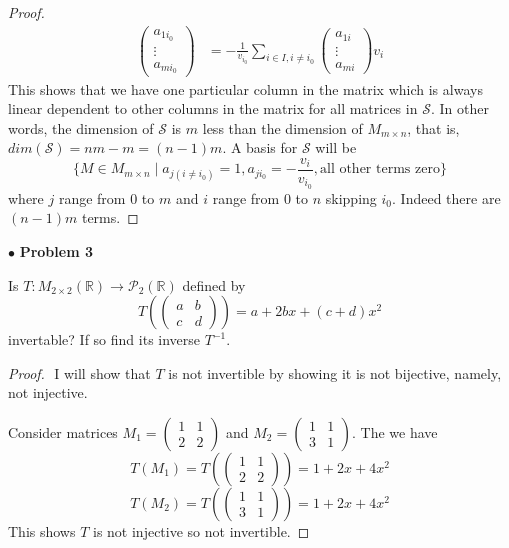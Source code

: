 \documentclass{article}
\begin{document}
\begin{proof}
\begin{align*}
  \begin{pmatrix} a_{1{i_0}} \\ \vdots \\ a_{m{i_0}} \end{pmatrix}  &= -\frac{1}{v_{i_0}}\sum_{i \in I, i \ne i_0} \begin{pmatrix} a_{1i} \\ \vdots \\ a_{mi} \end{pmatrix} v_i 
 \end{align*}
This shows that we have one particular column in the matrix which is always linear dependent to other columns in the matrix for all matrices in $\mathcal{S}$. In other words, the dimension of $\mathcal{S}$ is $m$ less than the dimension of $M_{m\times n}$, that is, $dim(\mathcal{S}) = nm - m = (n-1)m$. A basis for $\mathcal{S}$ will be $$ \{ M \in M_{m \times n}    \; | \; a_{j(i \ne i_0)} =1, a_{j{i_0}} = -\frac{v_i}{v_{i_0}} , \text{all other terms zero} \} $$
where $j$ range from $0$ to $m$ and $i$ range from $0$ to $n$ skipping $i_0$. Indeed there are $(n-1)m$ terms.
\end{proof}

\newpage
$ \bullet$ \textbf{Problem 3}
\medskip

\begin{itshape}
Is $T: M_{2 \times 2}(\mathbb{R}) \to \mathcal{P}_2(\mathbb{R})$ defined by $$T( \begin{pmatrix} a & b \\ c & d \end{pmatrix} ) = a+2bx + (c+d)x^2$$ invertable? If so find its inverse $T^{-1}$.
\end{itshape}
\medskip

\begin{proof}
$ $\newline
I will show that $T$ is not invertible by showing it is not bijective, namely, not injective.

Consider matrices $M_1=\begin{pmatrix} 1 & 1 \\ 2 & 2 \end{pmatrix}$ and $M_2=\begin{pmatrix} 1 & 1 \\ 3 & 1 \end{pmatrix}$. The we have $$T(M_1) = T(\begin{pmatrix} 1 & 1 \\ 2 & 2 \end{pmatrix}) = 1+2x+4x^2$$ $$T(M_2) = T(\begin{pmatrix} 1 & 1 \\ 3 & 1 \end{pmatrix}) = 1+2x+4x^2$$
This shows $T$ is not injective so not invertible.
\end{proof}
\end{document}
